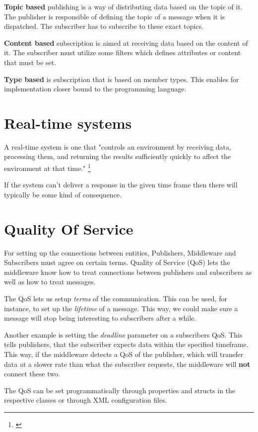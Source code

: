 \textbf{Topic based} publishing is a way of distributing data based on the topic of it. The publisher is responsible of defining the topic of a message when it is dispatched. The subscriber has to subscribe to these exact topics.

\textbf{Content based} subscription is aimed at receiving data based on the content of it. The subscriber must utilize some filters which defines attributes or content that must be set.

\textbf{Type based} is subscription that is based on member types. This enables for implementation closer bound to the programming language.


\section{Real-time systems}
A real-time system is one that "controls an environment by receiving data, processing them, and returning the results sufficiently quickly to affect the environment at that time." \footnote{\citep{ProgrammingRealTimeComputerSystem}}

If the system can't deliver a response in the given time frame then there will typically be some kind of consequence.

\section{Quality Of Service}
For setting up the connections between entities, Publishers, Middleware and Subscribers must agree on certain terms. Quality of Service (QoS) lets the middleware know how to treat connections between publishers and subscribers as well as how to treat messages.

The QoS lets us setup \textit{terms} of the communication. This can be used, for instance, to set up the \textit{lifetime} of a message. This way, we could make sure a message will stop being interesting to subscribers after a while. 

Another example is setting the \textit{deadline} parameter on a subscribers QoS. This tells publishers, that the subscriber expects data within the specified timeframe. This way, if the middleware detects a QoS of the publisher, which will transfer data at a slower rate than what the subscriber requests, the middleware will \textbf{not} connect these two.

The QoS can be set programmatically through properties and structs in the respective classes or through XML configuration files. 


